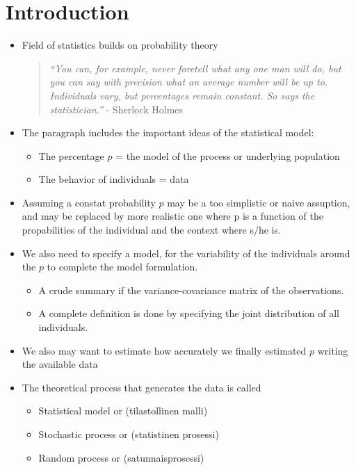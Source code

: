 \documentclass[10pt, twoside, a4paper]{book}
\theoremstyle{definition}
\begin{document}
\section{Introduction}
\begin{itemize}
  \item Field of statistics builds on probability theory
  \begin{quotation}
  \textit{``You can, for example, never foretell what any one man will do, but
  you can say with precision what an average number will be up to. Individuals vary,
  but percentages remain constant. So says the statistician.''} - Sherlock Holmes
  \end{quotation}
  \item The paragraph includes the important ideas of the statistical model:
  \begin{itemize}
    \item The percentage $p$ = the model of the process or underlying
    population
    \item The behavior of individuals = data
  \end{itemize}
  \item Assuming a constat probability $p$ may be a too simplistic or naive
  assuption, and may be replaced by more realistic one where p is a function of
  the propabilities of the individual and the context where s/he is.
  \item We also need to specify a model, for the variability of the
  individuals around the $p$ to complete the model formulation.
  \begin{itemize}
    \item A crude summary if the variance-covariance matrix of the
    observations.
    \item A complete definition is done by specifying the joint distribution
    of all individuals.
  \end{itemize}
  \item We also may want to estimate how accurately we finally estimated $p$
  writing the available data
  \item The theoretical process that generates the data is called
  \begin{itemize}
    \item Statistical model  or (tilastollinen malli)
    \item Stochastic process  or (statistinen prosessi)
    \item Random process or (satunnaisprosessi)
  \end{itemize}

\end{itemize}
\end{document}
